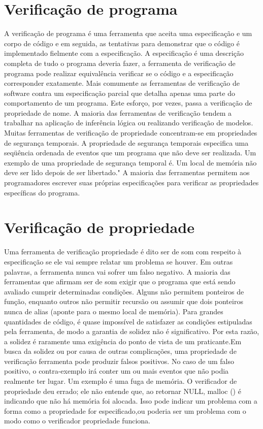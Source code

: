 	\section {Verificação de programa}
	A verificação de programa é uma ferramenta que aceita uma especificação e um corpo de código e em seguida, as tentativas para demonstrar que o código é implementado fielmente com a especificação. A especificação é uma descrição completa de tudo o programa deveria fazer, a ferramenta de verificação de programa pode realizar equivalência verificar se o código e a especificação corresponder exatamente. Mais comumente as ferramentas de verificação de software contra um especificação parcial que detalha apenas uma parte do comportamento de um programa. Este esforço, por vezes, passa a verificação de propriedade de nome. A maioria das ferramentas de verificação tendem a trabalhar na aplicação de inferência lógica ou realizando verificação de modelos. Muitas ferramentas de verificação de propriedade concentram-se em propriedades de segurança temporais. A propriedade de segurança temporais especifica uma seqüência ordenada de eventos que um programa que não deve ser realizada. Um exemplo de uma propriedade de segurança temporal é. Um local de memória não deve ser lido depois de ser libertado." A maioria das ferramentas permitem aos programadores escrever suas próprias especificações para verificar as propriedades específicas do programa.
	
	\section {Verificação de propriedade}
	Uma ferramenta de verificação propriedade é dito ser de som com respeito à especificação se ele vai sempre relatar um problema se houver. Em outras palavras, a ferramenta nunca vai sofrer um falso negativo. A maioria das ferramentas que afirmam ser de som exigir que o programa que está sendo avaliado cumprir determinadas condições. Alguns não permitem ponteiros de função, enquanto outros não permitir recursão ou assumir que dois ponteiros nunca de alias (aponte para o mesmo local de memória). Para grandes quantidades de código, é quase impossível de satisfazer as condições estipuladas pela ferramenta, de modo a garantia de solidez não é significativo. Por esta razão, a solidez é raramente uma exigência do ponto de vista de um praticante.Em busca da solidez ou por causa de outras complicações, uma propriedade de verificação ferramenta pode produzir falsos positivos. No caso de um falso positivo, o contra-exemplo irá conter um ou mais eventos que não podia realmente ter lugar. Um exemplo é uma fuga de memória. O verificador de propriedade deu errado; ele não entende que, ao retornar NULL, malloc () é indicando que não há memória foi alocada. Isso pode indicar um problema com a forma como a propriedade for especificado,ou poderia ser um problema com o modo como o verificador propriedade funciona.